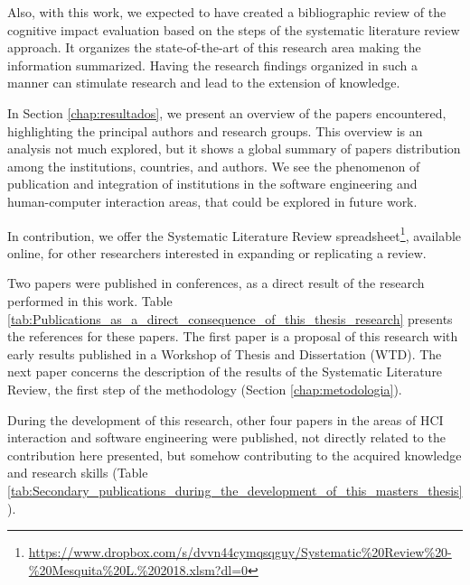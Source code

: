 Also, with this work, we expected to have created a bibliographic review of the cognitive impact evaluation based on the steps of the systematic literature review approach. It organizes the state-of-the-art of this research area making the information summarized. Having the research findings organized in such a manner can stimulate research and lead to the extension of knowledge.

In Section \ref{chap:resultados}, we present an overview of the papers encountered, highlighting the principal authors and research groups. This overview is an analysis not much explored, but it shows a global summary of papers distribution among the institutions, countries, and authors. We see the phenomenon of publication and integration of institutions in the software engineering and human-computer interaction areas, that could be explored in future work.

In contribution, we offer the Systematic Literature Review spreadsheet\footnote{\url{https://www.dropbox.com/s/dvvn44cymqsqguy/Systematic\%20Review\%20-\%20Mesquita\%20L.\%202018.xlsm?dl=0}}, available online, for other researchers interested in expanding or replicating a review.

Two papers were published in conferences, as a direct result of the research performed in this work. Table \ref{tab:Publications_as_a_direct_consequence_of_this_thesis_research} presents the references for these papers. The first paper \cite{Mesquita2017InBlind} is a proposal of this research with early results published in a Workshop of Thesis and Dissertation (WTD). The next paper \cite{Mesquita2018CognitiveReview} concerns the description of the results of the Systematic Literature Review, the first step of the methodology (Section \ref{chap:metodologia}).

During the development of this research, other four papers in the areas of HCI interaction and software engineering were published, not directly related to the contribution here presented, but somehow contributing to the acquired knowledge and research skills (Table \ref{tab:Secondary_publications_during_the_development_of_this_masters_thesis}).

